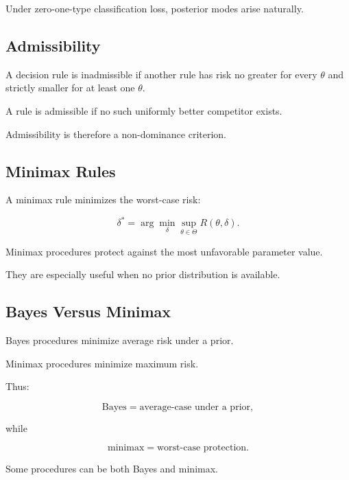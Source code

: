 Under zero-one-type classification loss, posterior modes arise naturally.

\subsection{Admissibility}
\label{subsec:admissibility}

A decision rule is inadmissible if another rule has risk no greater for
every \(\theta\) and strictly smaller for at least one \(\theta\).

A rule is admissible if no such uniformly better competitor exists.

Admissibility is therefore a non-dominance criterion.

\subsection{Minimax Rules}
\label{subsec:minimax-rules}

A minimax rule minimizes the worst-case risk:

\[
\boxed{
\delta^*
=
\arg\min_\delta
\sup_{\theta\in\Theta}
R
(
\theta,\delta
).
}
\]

Minimax procedures protect against the most unfavorable parameter value.

They are especially useful when no prior distribution is available.

\subsection{Bayes Versus Minimax}
\label{subsec:bayes-versus-minimax}

Bayes procedures minimize average risk under a prior.

Minimax procedures minimize maximum risk.

Thus:

\[
\boxed{
\text{Bayes}
=
\text{average-case under a prior},
}
\]

while

\[
\boxed{
\text{minimax}
=
\text{worst-case protection}.
}
\]

Some procedures can be both Bayes and minimax.

